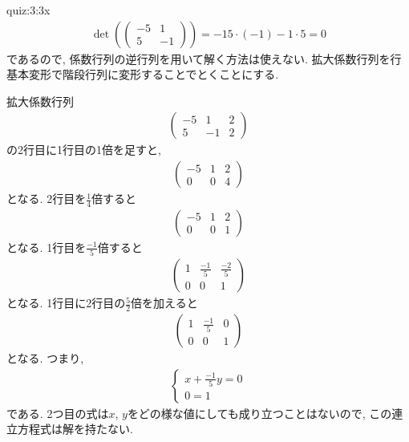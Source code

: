 \begin{answerof}{quiz:3:3x}
  \begin{align*}
    \det(\begin{pmatrix}-5&1\\5&-1\end{pmatrix})=-15\cdot(-1)-1\cdot 5 =0
  \end{align*}
  であるので, 係数行列の逆行列を用いて解く方法は使えない.
  拡大係数行列を行基本変形で階段行列に変形することでとくことにする.

  拡大係数行列
  \begin{align*}
    \begin{pmatrix}-5&1&2\\5&-1&2\end{pmatrix}
  \end{align*}
  の2行目に1行目の1倍を足すと,
  \begin{align*}
    \begin{pmatrix}-5&1&2\\0&0&4\end{pmatrix}
  \end{align*}
  となる.
  2行目を$\frac{1}{4}$倍すると
  \begin{align*}
    \begin{pmatrix}-5&1&2\\0&0&1\end{pmatrix}
  \end{align*}
  となる.
  1行目を$\frac{-1}{5}$倍すると
  \begin{align*}
    \begin{pmatrix}1&\frac{-1}{5}&\frac{-2}{5}\\0&0&1\end{pmatrix}
  \end{align*}
  となる.
  1行目に2行目の$\frac{5}{2}$倍を加えると
  \begin{align*}
    \begin{pmatrix}1&\frac{-1}{5}&0\\0&0&1\end{pmatrix}
  \end{align*}
  となる.
  つまり,
  \begin{align*}
    \begin{cases}
      x+\frac{-1}{5}y=0\\
      0=1
    \end{cases}
  \end{align*}
  である.
  2つ目の式は$x$, $y$をどの様な値にしても成り立つことはないので,
  この連立方程式は解を持たない.
\end{answerof}


